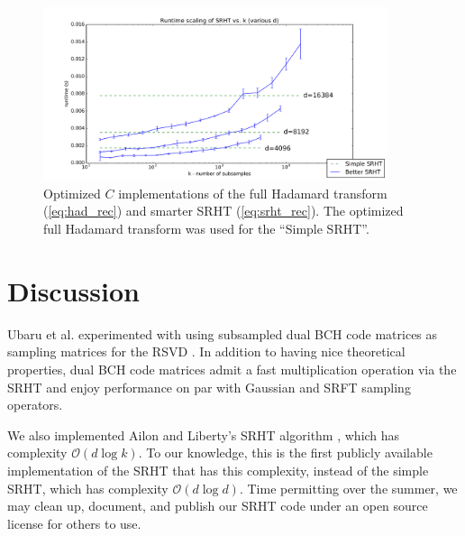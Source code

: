 \documentclass[12pt]{article}
\begin{document}
\begin{figure}[ht!]
   \centering
   \includegraphics[width=0.9\textwidth]{figures/srht_C_k_scaling.pdf}
   \caption{Optimized $C$ implementations of the full Hadamard transform (\ref{eq:had_rec}) and smarter SRHT (\ref{eq:srht_rec}).  The optimized full Hadamard transform was used for the ``Simple SRHT''.}
   \label{fig:srht_C}
\end{figure}


\section{Discussion}
Ubaru et al. experimented with using subsampled dual BCH code matrices as sampling matrices for the RSVD \cite{ubaru2015low}.  In addition to having nice theoretical properties, dual BCH code matrices admit a fast multiplication operation via the SRHT and enjoy performance on par with Gaussian and SRFT sampling operators.

We also implemented Ailon and Liberty's SRHT algorithm \cite{ailon2009fast}, which has complexity $\mathcal{O}(d\log k)$.  To our knowledge, this is the first publicly available implementation of the SRHT that has this complexity, instead of the simple SRHT, which has complexity $\mathcal{O}(d\log d)$.  Time permitting over the summer, we may clean up, document, and publish our SRHT code under an open source license for others to use.

\newpage 



 
\end{document}
